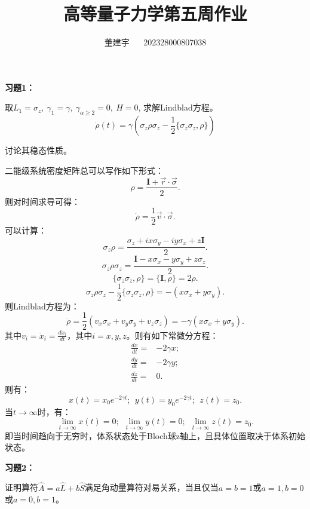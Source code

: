 \documentclass[reqno,a4paper,12pt]{amsart}
\title{高等量子力学第五周作业}
\author{董建宇 ~~ 202328000807038}
\begin{document}
\maketitle
\titleformat{\section}[hang]{\small}{\thesection}{0.8em}{}{}
\titleformat{\subsection}[hang]{\small}{\thesubsection}{0.8em}{}{}

\textbf{习题1：}

取$L_1 = \sigma_z, \ \gamma_1 = \gamma, \ \gamma_{\alpha\geq 2} = 0, \ H = 0$, 求解Lindblad方程。
\[
	\dot{\rho}(t) = \gamma \left( \sigma_z\rho\sigma_z - \frac{1}{2}\{ \sigma_z\sigma_z, \rho \} \right)
\]

讨论其稳态性质。
\begin{tcolorbox}[breakable, colback = black!5!white, colframe = black]
二能级系统密度矩阵总可以写作如下形式：
\[
	\rho = \frac{\mathbf{I} + \vec{r} \cdot \vec{\sigma}}{2}.
\]
则对时间求导可得：
\[
	\dot{\rho} = \frac{1}{2} \vec{v}\cdot\vec{\sigma}.
\]
可以计算：
\[
	\sigma_z \rho = \frac{\sigma_z+ix\sigma_y-iy\sigma_x+z\mathbf{I}}{2}.
\]
\[
	\sigma_z\rho\sigma_z = \frac{\mathbf{I} - x\sigma_x - y\sigma_y + z\sigma_z}{2}.
\]
\[
	\{ \sigma_z\sigma_z, \rho \} = \{ \mathbf{I}, \rho \} = 2\rho.
\]
\[
	\sigma_z\rho\sigma_z - \frac{1}{2}\{\sigma_z\sigma_z, \rho\} = -(x\sigma_x+y\sigma_y).
\]
则Lindblad方程为：
\[
	\dot{\rho} = \frac{1}{2}(v_x\sigma_x+v_y\sigma_y+v_z\sigma_z) = -\gamma(x\sigma_x+y\sigma_y).
\]
其中$v_i = \dot{x}_i = \frac{dx_i}{dt}$，其中$i = x, y, z$。则有如下常微分方程：
\begin{align*}
	\frac{dx}{dt} =& -2\gamma x; \\
	\frac{dy}{dt} =& -2\gamma y; \\
	\frac{dz}{dt} =& 0.
\end{align*}
则有：
\[
	x(t) = x_0 e^{-2\gamma t}; \ \ y(t) = y_0 e^{-2\gamma t}; \ \ z(t) = z_0.
\]
当$t\to \infty$时，有：
\[
	\lim_{t\to\infty} x(t) = 0; \ \ \lim_{t\to\infty} y(t) = 0; \ \ \lim_{t\to\infty} z(t) = z_0.
\]
即当时间趋向于无穷时，体系状态处于Bloch球z轴上，且具体位置取决于体系初始状态。
\end{tcolorbox}

\textbf{习题2：}

证明算符$\hat{A} = a\hat{L}+b\hat{S}$满足角动量算符对易关系，当且仅当$a=b=1$或$a=1,b=0$或$a=0,b=1$。
\end{document}
